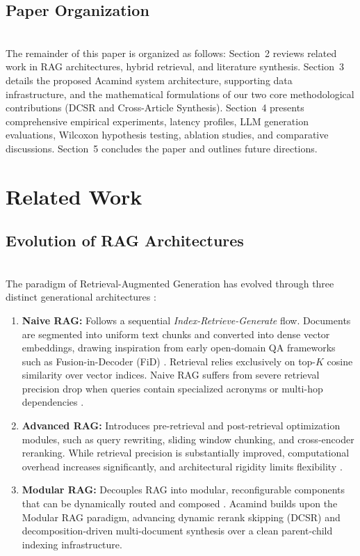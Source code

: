 \documentclass[10pt]{SPIIRAS_Proceedings}
\begin{document}
\subsection{Paper Organization}~\\
\hspace*{\parindent}The remainder of this paper is organized as follows: Section~2 reviews related work in RAG architectures, hybrid retrieval, and literature synthesis. Section~3 details the proposed Acamind system architecture, supporting data infrastructure, and the mathematical formulations of our two core methodological contributions (DCSR and Cross-Article Synthesis). Section~4 presents comprehensive empirical experiments, latency profiles, LLM generation evaluations, Wilcoxon hypothesis testing, ablation studies, and comparative discussions. Section~5 concludes the paper and outlines future directions.

\section{Related Work}

\subsection{Evolution of RAG Architectures}~\\
\hspace*{\parindent}The paradigm of Retrieval-Augmented Generation has evolved through three distinct generational architectures \cite{gao2023retrieval}:
\begin{enumerate}
    \item \textbf{Naive RAG:} Follows a sequential \textit{Index-Retrieve-Generate} flow. Documents are segmented into uniform text chunks and converted into dense vector embeddings, drawing inspiration from early open-domain QA frameworks such as Fusion-in-Decoder (FiD) \cite{izacard2021leveraging}. Retrieval relies exclusively on top-$K$ cosine similarity over vector indices. Naive RAG suffers from severe retrieval precision drop when queries contain specialized acronyms or multi-hop dependencies \cite{lewis2020retrieval}.
    \item \textbf{Advanced RAG:} Introduces pre-retrieval and post-retrieval optimization modules, such as query rewriting, sliding window chunking, and cross-encoder reranking. While retrieval precision is substantially improved, computational overhead increases significantly, and architectural rigidity limits flexibility \cite{yan2024corrective}.
    \item \textbf{Modular RAG:} Decouples RAG into modular, reconfigurable components that can be dynamically routed and composed \cite{gao2024modular}. Acamind builds upon the Modular RAG paradigm, advancing dynamic rerank skipping (DCSR) and decomposition-driven multi-document synthesis over a clean parent-child indexing infrastructure.
\end{enumerate}
\end{document}
